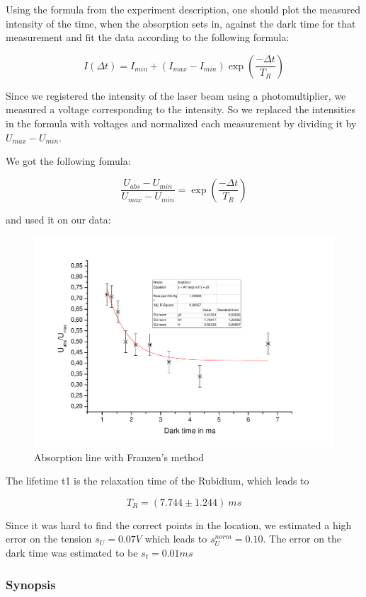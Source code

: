 Using the formula from the experiment description, one should plot the measured intensity of the time, when the absorption sets in, against the dark time for that measurement and fit the data according to the following formula:

$$I(\Delta t) = I_{min} + (I_{max} - I_{min})\exp\left(\frac{-\Delta t}{T_R}\right) $$

Since we registered the intensity of the laser beam using a photomultiplier, we measured a voltage corresponding to the intensity. So we replaced the intensities in the formula with voltages and normalized each measurement by dividing it by $U_{max} - U_{min}$.

We got the following fomula:

$$ \frac{U_{abs} - U_{min}}{U_{max}-U_{min}} = \exp\left(\frac{-\Delta t}{T_R}\right) $$

and used it on our data:

\begin{figure}[H]
\centering \includegraphics[width=1.1\textwidth]{BilderAusw/Franzen.pdf}
\caption{Absorption line with Franzen's method}
\end{figure}

The lifetime t1 is the relaxation time of the Rubidium, which leads to

$$\boxed{T_R = (7.744 \pm 1.244)\ ms}$$

Since it was hard to find the correct points in the location, we estimated a high error on the tension $s_U = 0.07 V$ which leads to $s_U^{norm} = 0.10$. The error on the dark time was estimated to be $s_t = 0.01 ms$

\subsubsection{Synopsis}

